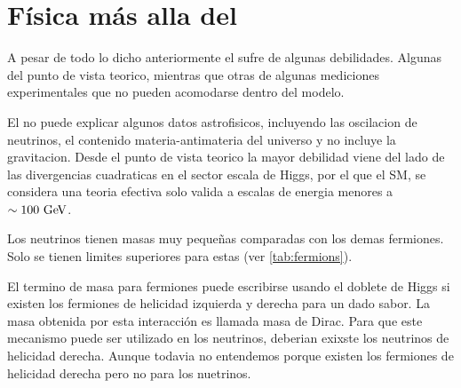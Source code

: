 \section{Física más alla del {\SM}}

A pesar de todo lo dicho anteriormente el {\SM} sufre de algunas debilidades. Algunas del
punto de vista teorico, mientras que otras de algunas mediciones experimentales que no pueden
acomodarse dentro del modelo.

El {\SM} no puede explicar algunos datos astrofisicos, incluyendo
las oscilacion de neutrinos, el contenido materia-antimateria del
universo y no incluye la gravitacion. Desde el punto de vista
teorico la mayor debilidad viene del lado de las divergencias
cuadraticas en el sector escala de Higgs, por el que el SM, se
considera una teoria efectiva solo valida a escalas de energia
menores a $\sim 100 \gev$.

Los neutrinos tienen masas muy peque\~nas comparadas con los demas fermiones. Solo se tienen
limites superiores para estas (ver {\tab} \ref{tab:fermions}).

El termino de masa para fermiones puede escribirse usando el doblete de Higgs si existen
los fermiones de helicidad izquierda y derecha para un dado sabor. La masa obtenida por
esta interacci\'on es llamada masa de Dirac. Para que este mecanismo puede ser utilizado
en los neutrinos, deberian exixste los neutrinos de helicidad derecha. Aunque todavia
no entendemos porque existen los fermiones de helicidad derecha pero no para los nuetrinos.




